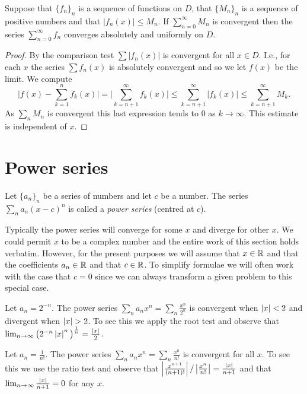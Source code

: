 \begin{theorem}
  Suppose that \({\{f_n\}}_n\) is a sequence of functions on \(D\), that \({\{M_n\}}_n\) is a sequence of positive numbers
  and that \(|f_n(x)|\leq M_n\).
  If \(\sum_{n=0}^{\infty}M_n\) is convergent then the series \(\sum_{n=0}^{\infty}f_n\) converges absolutely and uniformly on \(D\).
\end{theorem}

\begin{proof}
  By the comparison test \(\sum |f_n(x)| \) is convergent for all \(x\in D\).
  I.e., for each \(x\) the series \(\sum f_n(x) \) is absolutely convergent and so we let \(f(x)\) be the limit.
  We compute
  \[
    \Big|f(x) - \sum_{k=1}^{n} f_k(x)  \Big|
    =
    \Big|\sum_{k=n+1}^{\infty} f_k(x)  \Big|
    \leq \sum_{k=n+1}^{\infty} |f_k(x)|
    \leq  \sum_{k=n+1}^{\infty} M_k.
  \]
  As \(\sum_{n}M_n\) is convergent this last expression tends to \(0\) as \(k\to \infty\).
  This estimate is independent of \(x\).
\end{proof}

\section{Power series}

\begin{definition}
  Let \({\{a_n\}}_{n}\) be a series of numbers and let \(c\) be a number.
  The series
  \(\sum_{n} a_n {(x-c)}^n\)
  is called a \emph{power series} (centred at \(c\)).
\end{definition}
Typically the power series will converge for some \(x\) and diverge for other \(x\).
We could permit \(x\) to be a complex number and the entire work of this section holds verbatim.
However, for the present purposes we will assume that \(x \in \mathbb{R}\) and that the coefficients \(a_n \in \mathbb{R}\) and that \(c\in \mathbb{R}\).
To simplify formulae we will often work with the case that \(c=0\) since we can always transform a given problem to this special case.

\begin{example*}
  Let \(a_n = 2^{-n}\).
  The power series \(\sum_{n} a_n x^n = \sum_{n}\frac{x^n}{2^n}\) is convergent when \(\left|x\right|<2\) and divergent  when \(\left|x\right| > 2\).
  To see this we apply the root test and observe that  \(\lim_{n\to\infty}{\big(2^{-n}\left|x\right|^n \big)}^{\frac{1}{n}}=\frac{\left|x\right|}{2}\).
\end{example*}

\begin{example*}
  Let \(a_n = \frac{1}{n!}\).
  The power series \(\sum_{n} a_n x^n = \sum_{n}\frac{x^n}{n!}\) is convergent for all \(x\).
  To see this we use the ratio test and observe that  \(\left|\frac{x^{n+1}}{(n+1)!} \right|/ \left|\frac{x^n}{n!}\right| = \frac{\left|x\right|}{n+1}\) and that \(\lim_{n\to\infty} \frac{\left|x\right|}{n+1} = 0 \) for any \(x\).
\end{example*}



